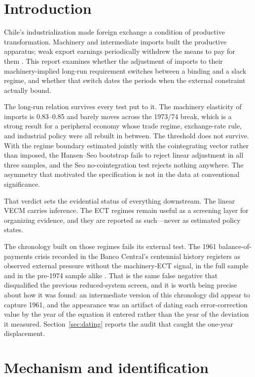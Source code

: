 \documentclass[11pt]{article}
\begin{document}
\FloatBarrier
\section{Introduction}

Chile's industrialization made foreign exchange a condition of productive transformation. Machinery and intermediate imports built the productive apparatus; weak export earnings periodically withdrew the means to pay for them \citep{bcch2025,alvarez2003}. This report examines whether the adjustment of imports to their machinery-implied long-run requirement switches between a binding and a slack regime, and whether that switch dates the periods when the external constraint actually bound.

The long-run relation survives every test put to it. The machinery elasticity of imports is 0.83--0.85 and barely moves across the 1973/74 break, which is a strong result for a peripheral economy whose trade regime, exchange-rate rule, and industrial policy were all rebuilt in between. The threshold does not survive. With the regime boundary estimated jointly with the cointegrating vector rather than imposed, the Hansen--Seo bootstrap fails to reject linear adjustment in all three samples, and the Seo no-cointegration test rejects nothing anywhere. The asymmetry that motivated the specification is not in the data at conventional significance.

That verdict sets the evidential status of everything downstream. The linear VECM carries inference. The ECT regimes remain useful as a screening layer for organizing evidence, and they are reported as such---never as estimated policy states.

The chronology built on those regimes fails its external test. The 1961 balance-of-payments crisis recorded in the Banco Central's centennial history registers as observed external pressure without the machinery-ECT signal, in the full sample and in the pre-1974 sample alike \citep{bcch2025}. That is the same false negative that disqualified the previous reduced-system screen, and it is worth being precise about how it was found: an intermediate version of this chronology did appear to capture 1961, and the appearance was an artifact of dating each error-correction value by the year of the equation it entered rather than the year of the deviation it measured. Section~\ref{sec:dating} reports the audit that caught the one-year displacement.

\FloatBarrier
\section{Mechanism and identification}
\end{document}
